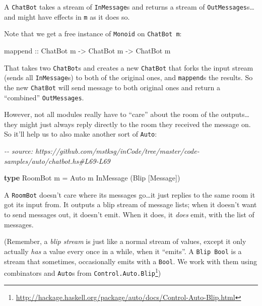 \documentclass[]{article}
\newenvironment{Shaded}{}{}
\newcommand{\CommentTok}[1]{\textcolor[rgb]{0.38,0.63,0.69}{\textit{#1}}}
\newcommand{\DataTypeTok}[1]{\textcolor[rgb]{0.56,0.13,0.00}{#1}}
\newcommand{\FunctionTok}[1]{\textcolor[rgb]{0.02,0.16,0.49}{#1}}
\newcommand{\KeywordTok}[1]{\textcolor[rgb]{0.00,0.44,0.13}{\textbf{#1}}}
\newcommand{\NormalTok}[1]{#1}
\newcommand{\OtherTok}[1]{\textcolor[rgb]{0.00,0.44,0.13}{#1}}
\renewcommand{\href}[2]{#2\footnote{\url{#1}}}
\begin{document}
A \texttt{ChatBot} takes a stream of \texttt{InMessage}s and returns a stream of
\texttt{OutMessages}s\ldots and might have effects in \texttt{m} as it does so.

Note that we get a free instance of \texttt{Monoid} on \texttt{ChatBot\ m}:

\begin{Shaded}
\begin{Highlighting}[]
\FunctionTok{mappend}\OtherTok{ ::} \DataTypeTok{ChatBot}\NormalTok{ m }\OtherTok{{-}\textgreater{}} \DataTypeTok{ChatBot}\NormalTok{ m }\OtherTok{{-}\textgreater{}} \DataTypeTok{ChatBot}\NormalTok{ m}
\end{Highlighting}
\end{Shaded}

That takes two \texttt{ChatBot}s and creates a new \texttt{ChatBot} that forks
the input stream (sends all \texttt{InMessage}s) to both of the original ones,
and \texttt{mappend}s the results. So the new \texttt{ChatBot} will send message
to both original ones and return a ``combined'' \texttt{OutMessages}.

However, not all modules really have to ``care'' about the room of the
outputs\ldots they might just always reply directly to the room they received
the message on. So it'll help us to also make another sort of \texttt{Auto}:

\begin{Shaded}
\begin{Highlighting}[]
\CommentTok{{-}{-} source: https://github.com/mstksg/inCode/tree/master/code{-}samples/auto/chatbot.hs\#L69{-}L69}

\KeywordTok{type} \DataTypeTok{RoomBot}\NormalTok{ m }\OtherTok{=} \DataTypeTok{Auto}\NormalTok{ m }\DataTypeTok{InMessage}\NormalTok{ (}\DataTypeTok{Blip}\NormalTok{ [}\DataTypeTok{Message}\NormalTok{])}
\end{Highlighting}
\end{Shaded}

A \texttt{RoomBot} doesn't care where its messages go\ldots it just replies to
the same room it got its input from. It outputs a blip stream of message lists;
when it doesn't want to send messages out, it doesn't emit. When it does, it
\emph{does} emit, with the list of messages.

(Remember, a \emph{blip stream} is just like a normal stream of values, except
it only actually \emph{has} a value every once in a while, when it ``emits''. A
\texttt{Blip\ Bool} is a stream that sometimes, occasionally emits with a
\texttt{Bool}. We work with them using combinators and \texttt{Auto}s from
\href{http://hackage.haskell.org/package/auto/docs/Control-Auto-Blip.html}{\texttt{Control.Auto.Blip}})
\end{document}
